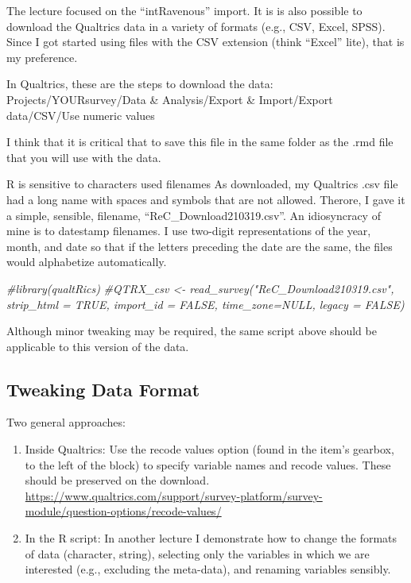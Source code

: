 \documentclass[
  english,
]{book}
\newenvironment{Shaded}{\begin{snugshade}}{\end{snugshade}}
\newcommand{\CommentTok}[1]{\textcolor[rgb]{0.56,0.35,0.01}{\textit{#1}}}
\begin{document}
The lecture focused on the ``intRavenous'' import. It is is also possible to download the Qualtrics data in a variety of formats (e.g., CSV, Excel, SPSS). Since I got started using files with the CSV extension (think ``Excel'' lite), that is my preference.

In Qualtrics, these are the steps to download the data: Projects/YOURsurvey/Data \& Analysis/Export \& Import/Export data/CSV/Use numeric values

I think that it is critical that to save this file in the same folder as the .rmd file that you will use with the data.

R is sensitive to characters used filenames As downloaded, my Qualtrics .csv file had a long name with spaces and symbols that are not allowed. Therore, I gave it a simple, sensible, filename, ``ReC\_Download210319.csv''. An idiosyncracy of mine is to datestamp filenames. I use two-digit representations of the year, month, and date so that if the letters preceding the date are the same, the files would alphabetize automatically.

\begin{Shaded}
\begin{Highlighting}[]
\CommentTok{\#library(qualtRics)}
\CommentTok{\#QTRX\_csv \textless{}{-} read\_survey("ReC\_Download210319.csv", strip\_html = TRUE, import\_id = FALSE, time\_zone=NULL, legacy = FALSE)}
\end{Highlighting}
\end{Shaded}

Although minor tweaking may be required, the same script above should be applicable to this version of the data.

\hypertarget{tweaking-data-format}{%
\subsection{Tweaking Data Format}\label{tweaking-data-format}}

Two general approaches:

\begin{enumerate}
\def\labelenumi{\arabic{enumi}.}
\item
  Inside Qualtrics: Use the recode values option (found in the item's gearbox, to the left of the block) to specify variable names and recode values. These should be preserved on the download. \url{https://www.qualtrics.com/support/survey-platform/survey-module/question-options/recode-values/}
\item
  In the R script: In another lecture I demonstrate how to change the formats of data (character, string), selecting only the variables in which we are interested (e.g., excluding the meta-data), and renaming variables sensibly.
\end{enumerate}
\end{document}

